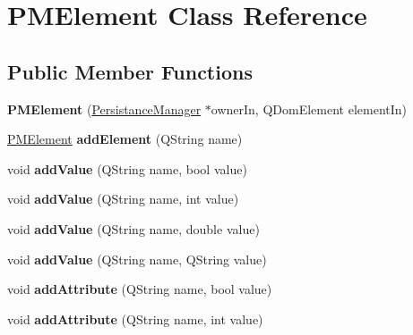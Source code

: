 \hypertarget{classPMElement}{
\section{PMElement Class Reference}
\label{classPMElement}
}
\subsection*{Public Member Functions}
\begin{DoxyCompactItemize}
\item 
\hypertarget{classPMElement_aaf767805374acfe4212530c6a68bea8f}{
{\bfseries PMElement} (\hyperlink{classPersistanceManager}{PersistanceManager} $\ast$ownerIn, QDomElement elementIn)}
\label{classPMElement_aaf767805374acfe4212530c6a68bea8f}

\item 
\hypertarget{classPMElement_a17a7cd68ecbca27fa58b0f69ed055387}{
\hyperlink{classPMElement}{PMElement} {\bfseries addElement} (QString name)}
\label{classPMElement_a17a7cd68ecbca27fa58b0f69ed055387}

\item 
\hypertarget{classPMElement_a876c0e281880fead7dbd75911a2c3e93}{
void {\bfseries addValue} (QString name, bool value)}
\label{classPMElement_a876c0e281880fead7dbd75911a2c3e93}

\item 
\hypertarget{classPMElement_a954974405145bd9a68961734b6742d65}{
void {\bfseries addValue} (QString name, int value)}
\label{classPMElement_a954974405145bd9a68961734b6742d65}

\item 
\hypertarget{classPMElement_a8ecb48a41bd01fc1b9685e51ad89aa83}{
void {\bfseries addValue} (QString name, double value)}
\label{classPMElement_a8ecb48a41bd01fc1b9685e51ad89aa83}

\item 
\hypertarget{classPMElement_a6a4ea26de47673b709864aa603212016}{
void {\bfseries addValue} (QString name, QString value)}
\label{classPMElement_a6a4ea26de47673b709864aa603212016}

\item 
\hypertarget{classPMElement_ada18dfe6db12c2452194024a7a73b479}{
void {\bfseries addAttribute} (QString name, bool value)}
\label{classPMElement_ada18dfe6db12c2452194024a7a73b479}

\item 
\hypertarget{classPMElement_aff235752a9d26313cd216eb15d1cd3b8}{
void {\bfseries addAttribute} (QString name, int value)}
\label{classPMElement_aff235752a9d26313cd216eb15d1cd3b8}


\end{DoxyCompactItemize}
